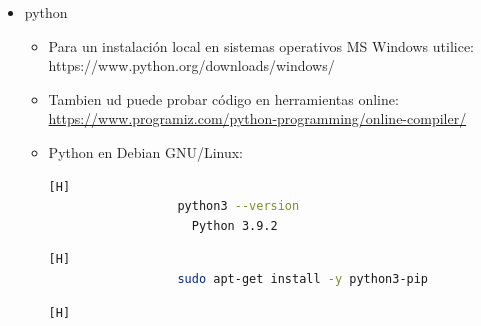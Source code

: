 \documentclass{article}
\begin{document}
\begin{itemize}
\begin{itemize}
\begin{itemize}
\begin{itemize}
\begin{lstlisting}
                apt-get install git    
                \end{lstlisting}
            \end{itemize}
            \item MS Windows
            \begin{itemize}
                \item Para descarga en sistemas MS Windows \url{https://git-scm.com/download/win}
            \end{itemize}
            \item MacOS
            \begin{itemize}
                \item Para descarga en sistemas MacOS \url{https://git-scm.com/download/mac}
                \begin{lstlisting}
                    brew install git
                \end{lstlisting}
            \end{itemize}
        \end{itemize}
        \item python
        \begin{itemize}
            \item Para un instalación local en sistemas operativos MS Windows utilice: https://www.python.org/downloads/windows/
            \item Tambien ud puede probar código en herramientas online: \url{https://www.programiz.com/python-programming/online-compiler/}
            \item Python en Debian GNU/Linux:
            \begin{itemize}
            \begin{lstlisting}[language=bash,caption={Debian Linux viene con Python 3 y Python 2 preinstalados.}][H]
		          python3 --version
                    Python 3.9.2
	        \end{lstlisting}
            \begin{lstlisting}[language=bash,caption={Instalemos pip, una herramienta que instalará y administrará los paquetes de programación que queramos usar en nuestros proyectos de desarrollo.}][H]
		          sudo apt-get install -y python3-pip
	        \end{lstlisting}
            \begin{lstlisting}[language=bash,caption={Paquetes y herramientas de desarrollo más para instalar para garantizar que tengamos una configuración sólida para nuestro entorno de programación:}][H]

\end{lstlisting}
\end{itemize}
\end{itemize}
\end{itemize}
\end{itemize}
\end{document}
